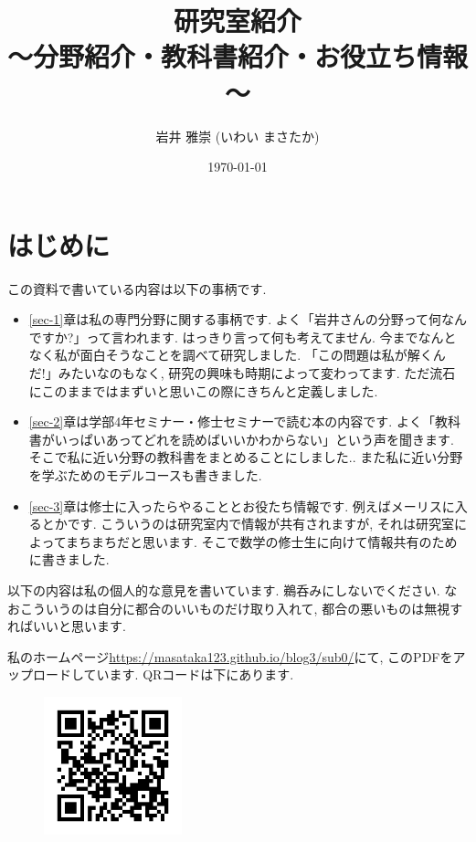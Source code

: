 \documentclass[dvipdfmx,a4paper,12pt]{article} %
\title{研究室紹介\\[0.5em] \large～分野紹介・教科書紹介・お役立ち情報～} %
\author{岩井 雅崇 (いわい まさたか)} %
\date{\today} %
\theoremstyle{definition}
\theoremstyle{remark}
\numberwithin{equation}{section}
\begin{document}

\maketitle %


\section*{はじめに}

この資料で書いている内容は以下の事柄です.
\begin{itemize}[left=0pt]
  \setlength{\parskip}{0cm} %
  \setlength{\itemsep}{8pt} %
  \item \ref{sec-1}章は私の専門分野に関する事柄です. よく「岩井さんの分野って何なんですか?」って言われます. はっきり言って何も考えてません. 今までなんとなく私が面白そうなことを調べて研究しました. 「この問題は私が解くんだ!」みたいなのもなく, 研究の興味も時期によって変わってます. ただ流石にこのままではまずいと思いこの際にきちんと定義しました. 
  \item \ref{sec-2}章は学部4年セミナー・修士セミナーで読む本の内容です. よく「教科書がいっぱいあってどれを読めばいいかわからない」という声を聞きます. そこで私に近い分野の教科書をまとめることにしました..
また私に近い分野を学ぶためのモデルコースも書きました.  
    \item \ref{sec-3}章は修士に入ったらやることとお役たち情報です. 例えばメーリスに入るとかです. 
  こういうのは研究室内で情報が共有されますが, それは研究室によってまちまちだと思います. 
そこで数学の修士生に向けて情報共有のために書きました.   
\end{itemize}

以下の内容は私の個人的な意見を書いています. 鵜呑みにしないでください. なおこういうのは自分に都合のいいものだけ取り入れて, 都合の悪いものは無視すればいいと思います.  

私のホームページ\url{https://masataka123.github.io/blog3/sub0/}にて, このPDFをアップロードしています. 
QRコードは下にあります.
\begin{figure}[htbp]
\begin{center}
 \includegraphics[height=40mm, width=40mm]{lab.png}
\end{center}
\end{figure}

\tableofcontents %





\end{document}

